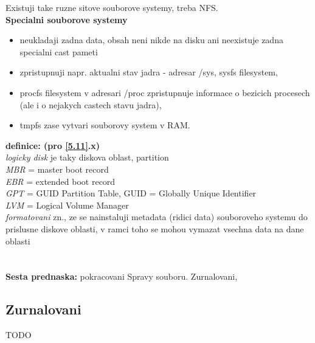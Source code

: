 \documentclass[a4paper, 11pt]{article}
\begin{document}
\noindent Existuji take ruzne sitove souborove systemy, treba NFS. \\

\noindent\textbf{Specialni souborove systemy}
\begin{itemize}
    \item neukladaji zadna data, obsah neni nikde na disku ani neexistuje zadna specialni cast pameti
    \item zpristupnuji napr. aktualni stav jadra - adresar /sys, sysfs filesystem,
    \item procfs filesystem v adresari /proc zpristupnuje informace o bezicich procesech (ale i o nejakych castech stavu jadra),
    \item tmpfs zase vytvari souborovy system v RAM. \\
\end{itemize}

\noindent\textbf{definice: (pro \ref{5.11}.x)} \\[0.5em]
\textit{logicky disk} je taky diskova oblast, partition \\[0.2em]
\textit{MBR} = master boot record \\[0.2em]
\textit{EBR} = extended boot record \\[0.2em]
\textit{GPT} = GUID Partition Table, GUID = Globally Unique Identifier \\[0.2em]
\textit{LVM} = Logical Volume Manager \\[0.2em]
\textit{formatovani} zn., ze se nainstaluji metadata (ridici data) souboroveho systemu do prislusne diskove oblasti, v ramci toho se mohou vymazat vsechna data na dane oblasti \\[0.2em]

\newpage

\section{}
\textbf{Sesta prednaska:} pokracovani Spravy souboru. Zurnalovani, 
\subsection{Zurnalovani}
TODO
\end{document}
